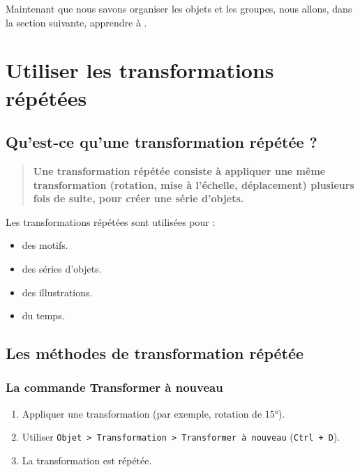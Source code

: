 Maintenant que nous savons organiser les objets et les groupes, nous allons, dans la section suivante, apprendre à .

\section{Utiliser les transformations répétées}

\subsection{Qu'est-ce qu'une transformation répétée ?}

\begin{quote}
\textbf{Une transformation répétée consiste à appliquer une même transformation (rotation, mise à l'échelle, déplacement) plusieurs fois de suite, pour créer une série d'objets.}
\end{quote}

Les transformations répétées sont utilisées pour :

\begin{itemize}
    \item {} des motifs.
    \item {} des séries d'objets.
    \item {} des illustrations.
    \item {} du temps.
\end{itemize}

\subsection{Les méthodes de transformation répétée}

\subsubsection{La commande Transformer à nouveau}

\begin{enumerate}
    \item Appliquer une transformation (par exemple, rotation de 15°).
    \item Utiliser \texttt{Objet > Transformation > Transformer à nouveau} (\texttt{Ctrl + D}).
    \item La transformation est répétée.
\end{enumerate}

